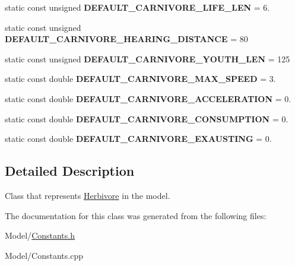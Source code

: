 \begin{DoxyCompactItemize}
\item 
\hypertarget{class_constants_ab038ed8880f9f38ce69853a08ad32674}{}static const unsigned {\bfseries D\+E\+F\+A\+U\+L\+T\+\_\+\+C\+A\+R\+N\+I\+V\+O\+R\+E\+\_\+\+L\+I\+F\+E\+\_\+\+L\+E\+N} = 6.\label{class_constants_ab038ed8880f9f38ce69853a08ad32674}

\item 
\hypertarget{class_constants_a7eb6ac7ce35a576ed1ad2064920c9733}{}static const unsigned {\bfseries D\+E\+F\+A\+U\+L\+T\+\_\+\+C\+A\+R\+N\+I\+V\+O\+R\+E\+\_\+\+H\+E\+A\+R\+I\+N\+G\+\_\+\+D\+I\+S\+T\+A\+N\+C\+E} = 80\label{class_constants_a7eb6ac7ce35a576ed1ad2064920c9733}

\item 
\hypertarget{class_constants_aede16ec3483d9fcb0461147f58a2186a}{}static const unsigned {\bfseries D\+E\+F\+A\+U\+L\+T\+\_\+\+C\+A\+R\+N\+I\+V\+O\+R\+E\+\_\+\+Y\+O\+U\+T\+H\+\_\+\+L\+E\+N} = 125\label{class_constants_aede16ec3483d9fcb0461147f58a2186a}

\item 
\hypertarget{class_constants_a11df90f6e963fe179fa9900aaa4118bc}{}static const double {\bfseries D\+E\+F\+A\+U\+L\+T\+\_\+\+C\+A\+R\+N\+I\+V\+O\+R\+E\+\_\+\+M\+A\+X\+\_\+\+S\+P\+E\+E\+D} = 3.\label{class_constants_a11df90f6e963fe179fa9900aaa4118bc}

\item 
\hypertarget{class_constants_afbaf2966b068fa3f82bb16d6a255e6cb}{}static const double {\bfseries D\+E\+F\+A\+U\+L\+T\+\_\+\+C\+A\+R\+N\+I\+V\+O\+R\+E\+\_\+\+A\+C\+C\+E\+L\+E\+R\+A\+T\+I\+O\+N} = 0.\label{class_constants_afbaf2966b068fa3f82bb16d6a255e6cb}

\item 
\hypertarget{class_constants_a2bb537933dfd417d2a1bc0bc72b4fe3e}{}static const double {\bfseries D\+E\+F\+A\+U\+L\+T\+\_\+\+C\+A\+R\+N\+I\+V\+O\+R\+E\+\_\+\+C\+O\+N\+S\+U\+M\+P\+T\+I\+O\+N} = 0.\label{class_constants_a2bb537933dfd417d2a1bc0bc72b4fe3e}

\item 
\hypertarget{class_constants_a0f960f74c431db529b2802de1d849368}{}static const double {\bfseries D\+E\+F\+A\+U\+L\+T\+\_\+\+C\+A\+R\+N\+I\+V\+O\+R\+E\+\_\+\+E\+X\+A\+U\+S\+T\+I\+N\+G} = 0.\label{class_constants_a0f960f74c431db529b2802de1d849368}

\end{DoxyCompactItemize}


\subsection{Detailed Description}
Class that represents \hyperlink{class_herbivore}{Herbivore} in the model. 

The documentation for this class was generated from the following files\+:\begin{DoxyCompactItemize}
\item 
Model/\hyperlink{_constants_8h}{Constants.\+h}\item 
Model/Constants.\+cpp\end{DoxyCompactItemize}
